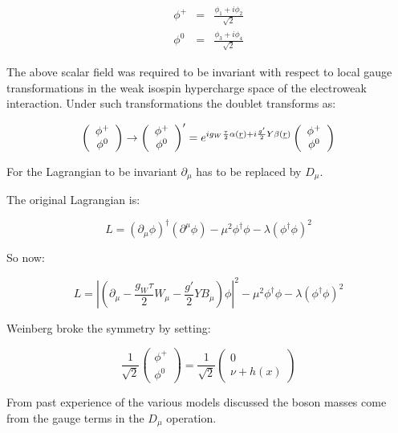 \begin{eqnarray*}
  \phi^{+} & = & \frac{\phi_1 + i\phi_2}{\sqrt{2}} \\
  \phi^{0} & = & \frac{\phi_3 + i\phi_4}{\sqrt{2}}
\end{eqnarray*}

The above scalar field was required to be invariant with respect to local gauge transformations in the weak isospin hypercharge space of the electroweak interaction.  Under such transformations the doublet transforms as:

\[
  \left(
  \begin{array}{c}
    \phi^+ \\
    \phi^0
  \end{array}
  \right)
  \to
  \left(
  \begin{array}{c}
    \phi^+ \\
    \phi^0
  \end{array}
  \right)'
  =
  e^{ig_W\frac{\tau}{2}\alpha(\underline{r}) + i\frac{g'}{2}Y\beta(\underline{r})}
  \left(
  \begin{array}{c}
    \phi^+ \\
    \phi^0
  \end{array}
  \right)
\]

For the Lagrangian to be invariant $\partial_{\mu}$ has to be replaced by $D_{\mu}$.

The original Lagrangian is:

\[
  L = \left(\partial_{\mu}\phi\right)^{\dagger}\left(\partial^{\mu}\phi\right) - \mu^2 \phi^{\dagger}\phi - \lambda\left(\phi^{\dagger}\phi\right)^2
\]

So now:

\[
  L = \left| \left(\partial_{\mu} - \frac{g_W\tau}{2}W_{\mu} - \frac{g'}{2}YB_{\mu}\right)\phi\right|^2 - \mu^2\phi^{\dagger}\phi - \lambda\left(\phi^{\dagger}\phi\right)^2
\]

Weinberg broke the symmetry by setting:

\[
  \frac{1}{\sqrt{2}}
  \left(
  \begin{array}{c}
    \phi^+ \\
    \phi^0
  \end{array}
  \right)
  =
  \frac{1}{\sqrt{2}}
  \left(
  \begin{array}{c}
    0 \\
    \nu + h(x)
  \end{array}
  \right)
\]

From past experience of the various models discussed the boson masses come from the gauge terms in the $D_{\mu}$ operation.

